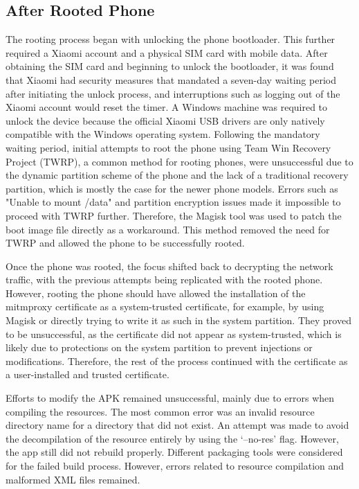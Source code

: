 \subsection*{After Rooted Phone}
The rooting process began with unlocking the phone bootloader. This further required a Xiaomi account and a physical SIM card with mobile data. After obtaining the SIM card and beginning to unlock the bootloader, it was found that Xiaomi had security measures that mandated a seven-day waiting period after initiating the unlock process, and interruptions such as logging out of the Xiaomi account would reset the timer. A Windows machine was required to unlock the device because the official Xiaomi USB drivers are only natively compatible with the Windows operating system. Following the mandatory waiting period, initial attempts to root the phone using Team Win Recovery Project (TWRP), a common method for rooting phones, were unsuccessful due to the dynamic partition scheme of the phone and the lack of a traditional recovery partition, which is mostly the case for the newer phone models. Errors such as "Unable to mount /data" and partition encryption issues made it impossible to proceed with TWRP further. Therefore, the Magisk tool was used to patch the boot image file directly as a workaround. This method removed the need for TWRP and allowed the phone to be successfully rooted.

Once the phone was rooted, the focus shifted back to decrypting the network traffic, with the previous attempts being replicated with the rooted phone. However, rooting the phone should have allowed the installation of the mitmproxy certificate as a system-trusted certificate, for example, by using Magisk or directly trying to write it as such in the system partition. They proved to be unsuccessful, as the certificate did not appear as system-trusted, which is likely due to protections on the system partition to prevent injections or modifications. Therefore, the rest of the process continued with the certificate as a user-installed and trusted certificate.

Efforts to modify the APK remained unsuccessful, mainly due to errors when compiling the resources. The most common error was an invalid resource directory name for a directory that did not exist. An attempt was made to avoid the decompilation of the resource entirely by using the `–no-res' flag. However, the app still did not rebuild properly. Different packaging tools were considered for the failed build process. However, errors related to resource compilation and malformed XML files remained.

